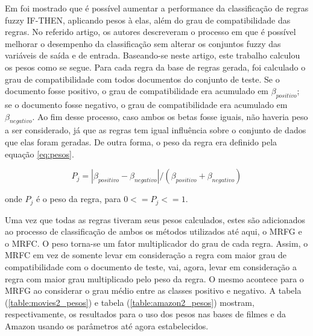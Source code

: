 \documentclass[template.tex]{subfiles}
\begin{document}
Em \cite{ishibuchi2001effect} foi mostrado que é possível aumentar a performance da classificação de regras fuzzy IF-THEN, aplicando pesos à elas, além do grau de compatibilidade das regras. No referido artigo, os autores descreveram o processo em que é possível melhorar o desempenho da classificação sem alterar os conjuntos fuzzy das variáveis de saída e de entrada. Baseando-se neste artigo, este trabalho calculou os pesos como se segue. Para cada regra da base de regras gerada, foi calculado o grau de compatibilidade com todos documentos do conjunto de teste. Se o documento fosse positivo, o grau de compatibilidade era acumulado em $\beta_{positivo}$; se o documento fosse negativo, o grau de compatibilidade era acumulado em $\beta_{negativo}$. Ao fim desse processo, caso ambos os betas fosse iguais, não haveria peso a ser considerado, já que as regras tem igual influência sobre o conjunto de dados que elas foram geradas. De outra forma, o peso da regra era definido pela equação \ref{eq:pesos}.

\begin{equation}
P_j = |\beta_{positivo} - \beta_{negativo}| / (\beta_{positivo} + \beta_{negativo})
\label{eq:pesos}
\end{equation}

onde $P_j$ é o peso da regra, para $0 <= P_j <= 1$. 


Uma vez que todas as regras tiveram seus pesos calculados, estes são adicionados ao processo de classificação de ambos os métodos utilizados até aqui, o MRFG e o MRFC. O peso torna-se um fator multiplicador do grau de cada regra. Assim, o MRFC em vez de somente levar em consideração a regra com maior grau de compatibilidade com o documento de teste, vai, agora, levar em consideração a regra com maior grau multiplicado pelo peso da regra. O mesmo acontece para o MRFG ao considerar o grau médio entre as classes positivo e negativo. A tabela (\ref{table:movies2_pesos}) e tabela (\ref{table:amazon2_pesos}) mostram, respectivamente, os resultados para o uso dos pesos nas bases de filmes e da Amazon usando os parâmetros até agora estabelecidos. 

\end{document}
